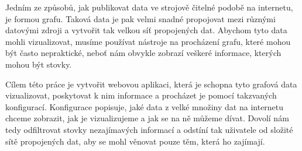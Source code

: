 \documentclass[12pt]{report}
\begin{document}

Jedním ze způsobů, jak publikovat data ve strojově čitelné podobě na internetu, je formou grafu. Taková data je pak velmi snadné propojovat mezi různými datovými zdroji a vytvořit tak velkou síť propojených dat. Abychom tyto data mohli vizualizovat, musíme používat nástroje na procházení grafu, které mohou být často nepraktické, neboť nám obvykle zobrazí veškeré informace, kterých mohou být stovky.

Cílem této práce je vytvořit webovou aplikaci, která je schopna tyto grafová data vizualizovat, poskytovat k nim informace a procházet je pomocí takzvaných konfigurací. Konfigurace popisuje, jaké data z velké množiny dat na internetu chceme zobrazit, jak je vizualizujeme a jak se na ně můžeme dívat. Dovolí nám tedy odfiltrovat stovky nezajímavých informací a odstíní tak uživatele od složité sítě propojených dat, aby se mohl věnovat pouze těm, která ho zajímají.
\end{document}
